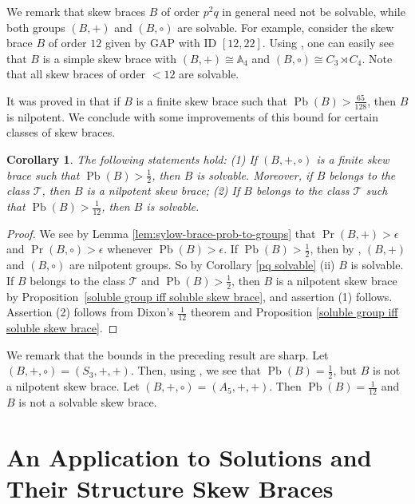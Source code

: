 \documentclass[11pt, oneside]{amsart}
\numberwithin{equation}{section}
\theoremstyle{plain}
\newtheorem{cor}[equation]{Corollary}
\theoremstyle{definition}
\newcommand{\Pb}{\operatorname{Pb} }
\renewcommand{\Pr}{\operatorname{Pr} }
\begin{document}
We remark that skew braces $B$ of order $p^2q$ in general  need not be solvable, while both groups $(B,+)$ and $(B,\circ)$ are solvable. For example, consider the skew brace $B$ of order $12$ given by GAP \cite{GAP} with ID $[12,22]$.  Using \cite{VK22}, one can easily see that $B$ is a  simple skew brace with $(B,+)\cong \mathbb{A}_4$ and $(B,\circ) \cong C_3\rtimes C_4$. Note that all skew braces of order $< 12$ are solvable.

It was proved in \cite[Theorem 4.5.]{MY26} that if $B$ is a finite skew brace such that $\Pb(B) > \frac{65}{128}$, then $B$ is nilpotent. We conclude with some improvements of this bound for certain classes of skew braces.

\begin{cor}\label{1\2 and 1\12 solvable}
The following statements hold: (1) If $(B,+,\circ)$ is a finite skew brace such that $\Pb(B)>\frac12$, then $B$ is solvable. Moreover, if $B$ belongs to the class $\mathcal{T}$, then $B$ is a nilpotent skew brace; (2) If $B$ belongs to the class $\mathcal{T}$ such that $\Pb(B) > \frac{1}{12}$, then $B$ is solvable.
\end{cor}
\begin{proof}
   We see by Lemma \ref{lem:sylow-brace-prob-to-groups} that $\Pr (B,+)>\epsilon $ and $\Pr (B,\circ)>\epsilon$ whenever $\Pb(B) > \epsilon$. If $\Pb(B)>\frac12$, then by \cite[Theorem 5.1.]{PL95}, $(B,+)$ and $(B,\circ)$ are nilpotent groups. So by Corollary \ref{pq solvable} (ii) $B$ is  solvable. If $B$ belongs to the class $\mathcal T$ and $\Pb(B)>\frac12$, then $B$ is a nilpotent skew brace by Proposition~\ref{soluble group iff soluble skew brace}, and assertion (1) follows. Assertion (2) follows from Dixon's $\frac{1}{12}$ theorem \cite{D73}  and Proposition \ref{soluble group iff soluble skew brace}.
\end{proof}



 We remark that the bounds in the preceding result are sharp.  Let $(B,+,\circ)= (S_3,+,+)$. Then, using \cite{VK22}, we see that  $\Pb(B) = \frac{1}{2}$, but $B$ is not a nilpotent skew brace.  Let $(B,+,\circ)= (A_5,+,+)$. Then $\Pb(B) = \frac{1}{12}$ and $B$ is not a solvable skew brace.
   




\section{An Application to Solutions and Their Structure Skew Braces}
\end{document}
